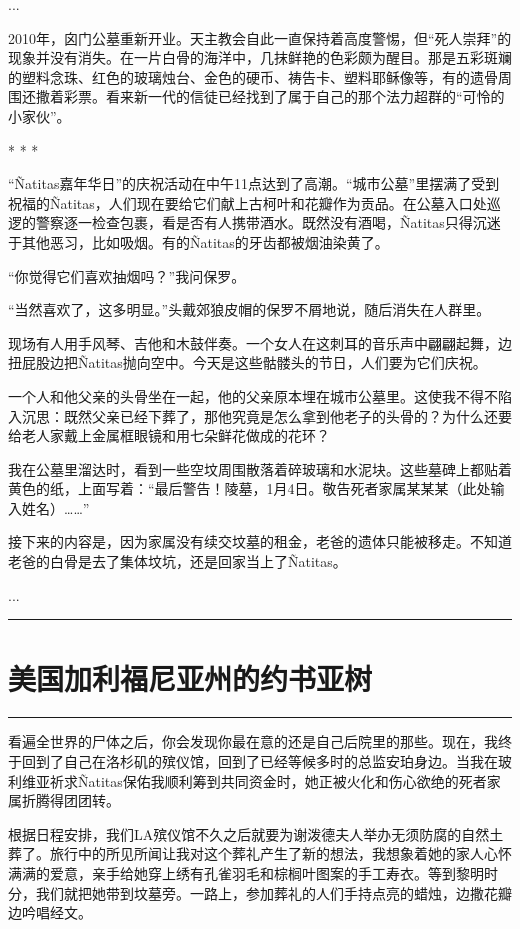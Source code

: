 \documentclass[12pt,oneside]{book}
\newcommand\hr{\par\noindent\hrule}
\begin{document}
...

2010年，囟门公墓重新开业。天主教会自此一直保持着高度警惕，但“死人崇拜”的现象并没有消失。在一片白骨的海洋中，几抹鲜艳的色彩颇为醒目。那是五彩斑斓的塑料念珠、红色的玻璃烛台、金色的硬币、祷告卡、塑料耶稣像等，有的遗骨周围还撒着彩票。看来新一代的信徒已经找到了属于自己的那个法力超群的“可怜的小家伙”。

\begin{center}
* * *
\end{center}

“Ñatitas嘉年华日”的庆祝活动在中午11点达到了高潮。“城市公墓”里摆满了受到祝福的Ñatitas，人们现在要给它们献上古柯叶和花瓣作为贡品。在公墓入口处巡逻的警察逐一检查包裹，看是否有人携带酒水。既然没有酒喝，Ñatitas只得沉迷于其他恶习，比如吸烟。有的Ñatitas的牙齿都被烟油染黄了。

“你觉得它们喜欢抽烟吗？”我问保罗。

“当然喜欢了，这多明显。”头戴郊狼皮帽的保罗不屑地说，随后消失在人群里。

现场有人用手风琴、吉他和木鼓伴奏。一个女人在这刺耳的音乐声中翩翩起舞，边扭屁股边把Ñatitas抛向空中。今天是这些骷髅头的节日，人们要为它们庆祝。

一个人和他父亲的头骨坐在一起，他的父亲原本埋在城市公墓里。这使我不得不陷入沉思：既然父亲已经下葬了，那他究竟是怎么拿到他老子的头骨的？为什么还要给老人家戴上金属框眼镜和用七朵鲜花做成的花环？

我在公墓里溜达时，看到一些空坟周围散落着碎玻璃和水泥块。这些墓碑上都贴着黄色的纸，上面写着：“最后警告！陵墓，1月4日。敬告死者家属某某某（此处输入姓名）……”

接下来的内容是，因为家属没有续交坟墓的租金，老爸的遗体只能被移走。不知道老爸的白骨是去了集体坟坑，还是回家当上了Ñatitas。

...

\hr  

\section{美国加利福尼亚州的约书亚树}
\hr 

看遍全世界的尸体之后，你会发现你最在意的还是自己后院里的那些。现在，我终于回到了自己在洛杉矶的殡仪馆，回到了已经等候多时的总监安珀身边。当我在玻利维亚祈求Ñatitas保佑我顺利筹到共同资金时，她正被火化和伤心欲绝的死者家属折腾得团团转。

根据日程安排，我们LA殡仪馆不久之后就要为谢泼德夫人举办无须防腐的自然土葬了。旅行中的所见所闻让我对这个葬礼产生了新的想法，我想象着她的家人心怀满满的爱意，亲手给她穿上绣有孔雀羽毛和棕榈叶图案的手工寿衣。等到黎明时分，我们就把她带到坟墓旁。一路上，参加葬礼的人们手持点亮的蜡烛，边撒花瓣边吟唱经文。
\end{document}
